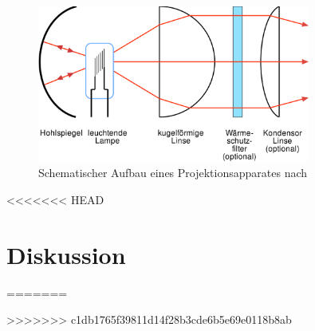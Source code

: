 \documentclass[11pt, a4paper]{article}
\begin{document}
    \begin{figure}[h]
        \centering
        \includegraphics[width=0.8\textwidth]{Condensor-1-de.svg.png}
        \caption{Schematischer Aufbau eines Projektionsapparates nach \cite{projektionsapparat}}
        \label{fig:projektionsapparat}
    \end{figure}




<<<<<<< HEAD
    \section{Diskussion}
=======

>>>>>>> c1db1765f39811d14f28b3cde6b5e69e0118b8ab

    
    
\end{document}
